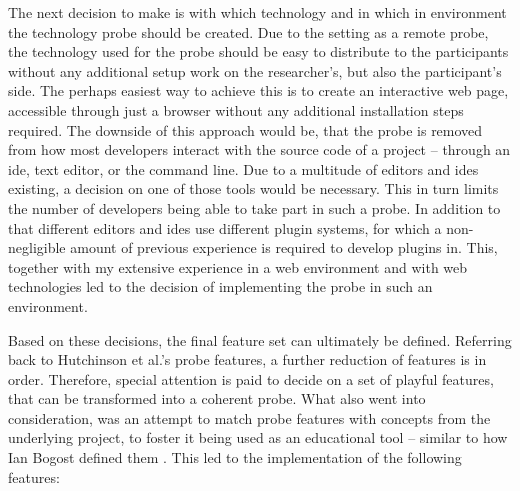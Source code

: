 The next decision to make is with which technology and in which in environment the technology probe should be created. Due to the setting as a remote probe, the technology used for the probe should be easy to distribute to the participants without any additional setup work on the researcher's, but also the participant's side. The perhaps easiest way to achieve this is to create an interactive web page, accessible through just a browser without any additional installation steps required. The downside of this approach would be, that the probe is removed from how most developers interact with the source code of a project -- through an \gls{ide}, text editor, or the command line. Due to a multitude of editors and \gls{ide}s existing, a decision on one of those tools would be necessary. This in turn limits the number of developers being able to take part in such a probe. In addition to that different editors and \gls{ide}s use different plugin systems, for which a non-negligible amount of previous experience is required to develop plugins in. This, together with my extensive experience in a web environment and with web technologies led to the decision of implementing the probe in such an environment.

Based on these decisions, the final feature set can ultimately be defined. Referring back to Hutchinson et al.'s probe features, a further reduction of features is in order. Therefore, special attention is paid to decide on a set of playful features, that can be transformed into a coherent probe. What also went into consideration, was an attempt to match probe features with concepts from the underlying project, to foster it being used as an educational tool -- similar to how Ian Bogost defined them \cite{bogost2007persuasive}. This led to the implementation of the following features:

